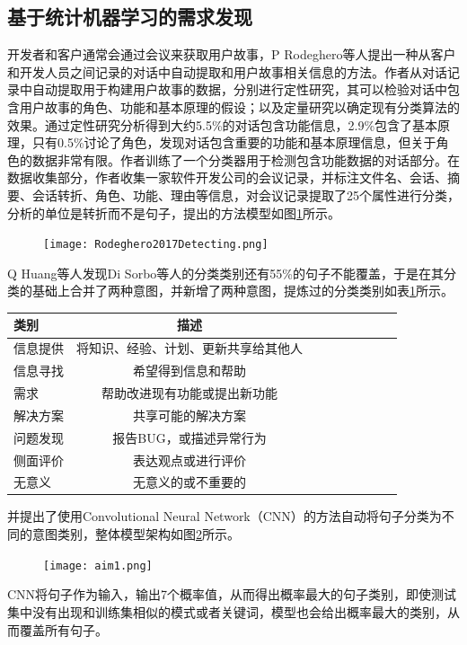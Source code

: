 \subsection{基于统计机器学习的需求发现}
开发者和客户通常会通过会议来获取用户故事，P Rodeghero等人\cite{Rodeghero2017Detecting}提出一种从客户和开发人员之间记录的对话中自动提取和用户故事相关信息的方法。作者从对话记录中自动提取用于构建用户故事的数据，分别进行定性研究，其可以检验对话中包含用户故事的角色、功能和基本原理的假设；以及定量研究以确定现有分类算法的效果。通过定性研究分析得到大约5.5\%的对话包含功能信息，2.9\%包含了基本原理，只有0.5\%讨论了角色，发现对话包含重要的功能和基本原理信息，但关于角色的数据非常有限。作者训练了一个分类器用于检测包含功能数据的对话部分。在数据收集部分，作者收集一家软件开发公司的会议记录，并标注文件名、会话、摘要、会话转折、角色、功能、理由等信息，对会议记录提取了25个属性进行分类，分析的单位是转折而不是句子，提出的方法模型如图\ref{fig:Rodeghero2017Detecting}所示。
\begin{figure}[htb]
    \centering
    \texttt{[image: Rodeghero2017Detecting.png]}
    \label{fig:Rodeghero2017Detecting}
\end{figure}

Q Huang等人\cite{Huang2018Automating}发现Di Sorbo等人的分类类别还有55\%的句子不能覆盖，于是在其分类的基础上合并了两种意图，并新增了两种意图，提炼过的分类类别如表\ref{tab:aim0}所示。
\begin{table}[htb]
    \label{tab:aim0}
    \centering
    \footnotesize%
    \setlength{\tabcolsep}{4pt}%
    \renewcommand{\arraystretch}{1.2}%
\begin{tabular}{lcccccccc}
\hline
类别   & 描述                 \\
\hline
信息提供 & 将知识、经验、计划、更新共享给其他人 \\
信息寻找 & 希望得到信息和帮助          \\
需求 & 帮助改进现有功能或提出新功能     \\
解决方案 & 共享可能的解决方案          \\
问题发现 & 报告BUG，或描述异常行为      \\
侧面评价 & 表达观点或进行评价          \\
无意义  & 无意义的或不重要的         \\
\hline
\end{tabular}
\end{table}
并提出了使用Convolutional Neural Network（CNN）\cite{kim2014convolutional}的方法自动将句子分类为不同的意图类别，整体模型架构如图\ref{fig:aim1}所示。
\begin{figure}[htbp]
    \centering
    \texttt{[image: aim1.png]}
    \label{fig:aim1}
\end{figure}
CNN将句子作为输入，输出7个概率值，从而得出概率最大的句子类别，即使测试集中没有出现和训练集相似的模式或者关键词，模型也会给出概率最大的类别，从而覆盖所有句子。

